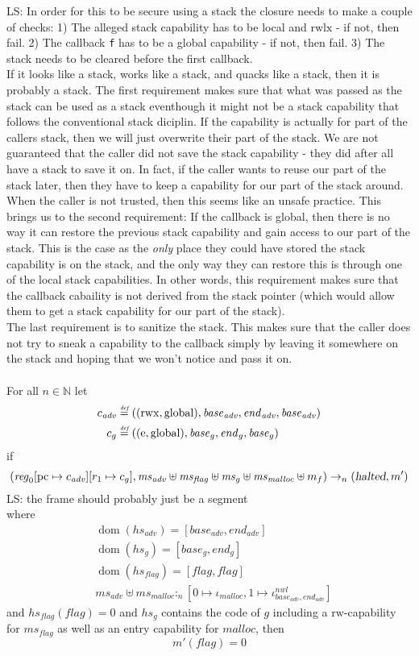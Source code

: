 \documentclass[a4paper]{article}
\newcommand{\forcenewline}{$\phantom{v}$\\}
\newcommand{\update}[2]{[#1 \mapsto #2]}
\newcommand{\defeq}{\stackrel{\textit{\tiny{def}}}{=}}
\DeclareMathOperator{\dom}{dom}
\newcommand\lau[1]{{\color{purple} \sf \footnotesize {LS: #1}}\\}
\newcommand{\var}[1]{\mathit{#1}}
\newcommand{\hs}{\var{ms}}
\newcommand{\pcreg}{\mathrm{pc}}
\newcommand{\start}{\var{base}}
\newcommand{\addrend}{\var{end}}
\newcommand{\reg}{\var{reg}}
\newcommand{\heap}{\var{mem}}
\newcommand{\adv}{\var{adv}}
\newcommand{\flag}{\var{flag}}
\newcommand{\halted}{\textsl{halted}}
\newcommand{\heapSat}[3][\heap]{#1 :_{#2} #3}
\newcommand{\codelabel}[1]{\mathit{#1}}
\newcommand{\malloc}{\codelabel{malloc}}
\newcommand{\nats}{\mathbb{N}}
\newcommand{\plainperm}[1]{\mathrm{#1}}
\newcommand{\readwrite}{\plainperm{rw}}
\newcommand{\entry}{\plainperm{e}}
\newcommand{\rwx}{\plainperm{rwx}}
\newcommand{\rwlx}{\plainperm{rwlx}}
\newcommand{\glob}{\plainperm{global}}
\newcommand{\step}[1][]{\rightarrow_{#1}}
\begin{document}
\lau{In order for this to be secure using a stack the closure needs to make a couple of checks: 1) The alleged stack capability has to be local and $\rwlx$ - if not, then fail. 2) The callback \texttt{f} has to be a global capability - if not, then fail. 3) The stack needs to be cleared before the first callback. \\If it looks like a stack, works like a stack, and quacks like a stack, then it is probably a stack. The first requirement makes sure that what was passed as the stack can be used as a stack eventhough it might not be a stack capability that follows the conventional stack diciplin. If the capability is actually for part of the callers stack, then we will just overwrite their part of the stack. We are not guaranteed that the caller did not save the stack capability - they did after all have a stack to save it on. In fact, if the caller wants to reuse our part of the stack later, then they have to keep a capability for our part of the stack around. When the caller is not trusted, then this seems like an unsafe practice. This brings us to the second requirement: If the callback is global, then there is no way it can restore the previous stack capability and gain access to our part of the stack. This is the case as the \emph{only} place they could have stored the stack capability is on the stack, and the only way they can restore this is through one of the local stack capabilities. In other words, this requirement makes sure that the callback cabaility is not derived from the stack pointer (which would allow them to get a stack capability for our part of the stack).\\ The last requirement is to sanitize the stack. This makes sure that the caller does not try to sneak a capability to the callback simply by leaving it somewhere on the stack and hoping that we won't notice and pass it on. }



\begin{lemma}\forcenewline
  For all $n \in \nats$
  let
  \begin{align*}
    c_{\var{adv}} & \defeq ((\rwx,\glob),\start_{\adv},\addrend_{\adv},\start_{\adv}) \\
    c_{g} & \defeq ((\entry,\glob),\start_g,\addrend_g,\start_g)
  \end{align*}
if
  \[
    (\reg_0\update{\pcreg}{c_{\adv}}
          \update{r_1}{c_g},\hs_{\adv} \uplus \hs_{\flag} \uplus \hs_{g} \uplus \hs_{\malloc} \uplus m_f) \step[n] (\halted,m')
  \]
\lau{the frame should probably just be a segment}
where 
\begin{align*}
  &\dom(hs_{\adv}) = [\start_\adv,\addrend_\adv] \\
  &\dom(hs_g) = [\start_g,\addrend_g] \\
  &\dom(hs_\flag) = [\flag,\flag] \\
  &\heapSat[\hs_{\adv} \uplus \hs_{\malloc}]{n}{[0 \mapsto \iota_{\malloc}, 1 \mapsto\iota^{\var{nwl}}_{\start_\adv,\addrend_\adv}]}
\end{align*}
and $hs_\flag(\flag) = 0$ and $hs_g$ contains the code of $g$ including a $\readwrite$-capability for $\hs_\flag$ as well as an entry capability for $\malloc$, 
then
\[
  m'(\flag) = 0
\]
\end{lemma}
\end{document}
